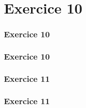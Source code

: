 \documentclass[svgnames,11pt]{beamer}
\begin{document}
\section{Exercice 10}
\begin{frame}
    \frametitle{Exercice 10}

    

\end{frame}
\begin{frame}
    \frametitle{Exercice 10}

    

\end{frame}
\begin{frame}
    \frametitle{Exercice 11}

    

\end{frame}
\begin{frame}
    \frametitle{Exercice 11}

    

\end{frame}
\end{document}
